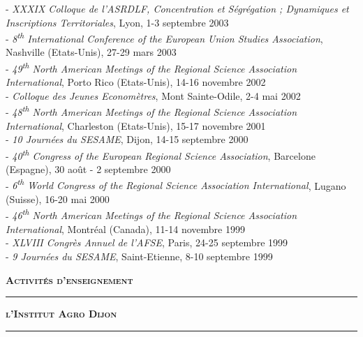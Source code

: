 \documentclass[a4paper,12pt]{article}
\newcommand{\bigtitre}[1]{%
	\begin{center}
		\textbf{\LARGE \textsc{#1}}
	\end{center}
	\medskip
	}
\newcommand{\titre}[1]{%
	\bigskip
	\noindent \rule[2mm]{\textwidth}{0.5pt}
	\textbf{\textsc{\large #1}} \\
	\noindent \rule[1mm]{\textwidth}{0.5pt}
	}
\begin{document}
- \textit{XXXIX\ieme{} Colloque de l'ASRDLF, Concentration et Ségrégation ; Dynamiques et Inscriptions Territoriales}, Lyon, 1-3 septembre 2003\\
- \textit{8\textsuperscript{th} International Conference of the European Union Studies Association}, Nashville (Etats-Unis), 27-29 mars 2003\\
- \textit{49\textsuperscript{th} North American Meetings of the Regional Science Association International}, Porto Rico (Etats-Unis), 14-16 novembre 2002\\
- \textit{Colloque des Jeunes Economètres}, Mont Sainte-Odile, 2-4 mai 2002\\
- \textit{48\textsuperscript{th} North American Meetings of the Regional Science Association International}, Charleston (Etats-Unis), 15-17 novembre 2001\\
- \textit{10\ieme{} Journées du SESAME}, Dijon, 14-15 septembre 2000\\
- \textit{40\textsuperscript{th} Congress of the European Regional Science Association}, Barcelone (Espagne), 30 août - 2 septembre 2000\\
- \textit{6\textsuperscript{th} World Congress of the Regional Science Association International}, Lugano (Suisse), 16-20 mai 2000\\
- \textit{46\textsuperscript{th} North American Meetings of the Regional Science Association International}, Montréal (Canada), 11-14 novembre 1999\\
- \textit{XLVIII\ieme{} Congrès Annuel de l'AFSE}, Paris, 24-25 septembre 1999\\
- \textit{9\ieme{} Journées du SESAME}, Saint-Etienne, 8-10 septembre 1999\\

\newpage


\bigtitre{Activités d'enseignement}

	
\titre{l'Institut Agro Dijon}
\end{document}
